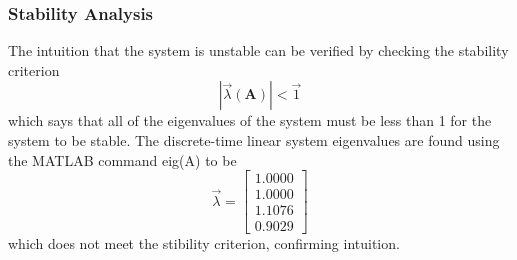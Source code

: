 \documentclass{article}
\newcommand{\matr}[1]{\bm{#1}}     %
\begin{document}
\subsubsection{Stability Analysis}
The intuition that the system is unstable can be verified by checking the stability criterion
\begin{equation}
|\vec{\lambda}(\matr{A})| < \vec{1}
\end{equation}
which says that all of the eigenvalues of the system must be less than 1 for the system to be stable. The discrete-time linear system eigenvalues are found using the MATLAB command eig(A) to be
\begin{equation}
\vec{\lambda} = \begin{bmatrix}
    1.0000 \\
    1.0000 \\
    1.1076 \\
    0.9029
\end{bmatrix}
\end{equation}
which does not meet the stibility criterion, confirming intuition.
\end{document}
